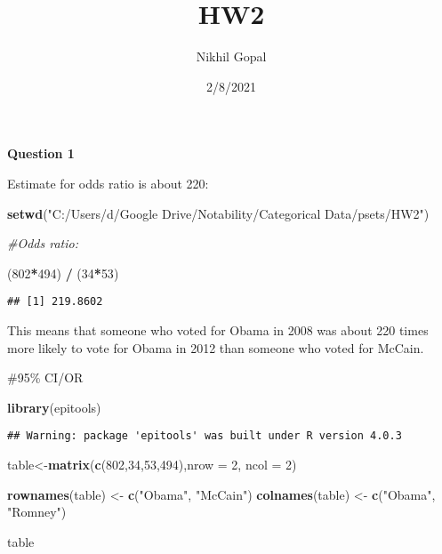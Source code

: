 \documentclass[
]{article}
\title{HW2}
\author{Nikhil Gopal}
\date{2/8/2021}
\newenvironment{Shaded}{\begin{snugshade}}{\end{snugshade}}
\newcommand{\CommentTok}[1]{\textcolor[rgb]{0.56,0.35,0.01}{\textit{#1}}}
\newcommand{\DataTypeTok}[1]{\textcolor[rgb]{0.13,0.29,0.53}{#1}}
\newcommand{\DecValTok}[1]{\textcolor[rgb]{0.00,0.00,0.81}{#1}}
\newcommand{\KeywordTok}[1]{\textcolor[rgb]{0.13,0.29,0.53}{\textbf{#1}}}
\newcommand{\NormalTok}[1]{#1}
\newcommand{\OperatorTok}[1]{\textcolor[rgb]{0.81,0.36,0.00}{\textbf{#1}}}
\newcommand{\StringTok}[1]{\textcolor[rgb]{0.31,0.60,0.02}{#1}}
\begin{document}
\maketitle

\textbf{Question 1}

Estimate for odds ratio is about 220:

\begin{Shaded}
\begin{Highlighting}[]
\KeywordTok{setwd}\NormalTok{(}\StringTok{"C:/Users/d/Google Drive/Notability/Categorical Data/psets/HW2"}\NormalTok{)}

\CommentTok{#Odds ratio: }

\NormalTok{(}\DecValTok{802}\OperatorTok{*}\DecValTok{494}\NormalTok{) }\OperatorTok{/}\StringTok{ }\NormalTok{(}\DecValTok{34}\OperatorTok{*}\DecValTok{53}\NormalTok{)}
\end{Highlighting}
\end{Shaded}

\begin{verbatim}
## [1] 219.8602
\end{verbatim}

This means that someone who voted for Obama in 2008 was about 220 times
more likely to vote for Obama in 2012 than someone who voted for McCain.

\#95\% CI/OR

\begin{Shaded}
\begin{Highlighting}[]
\KeywordTok{library}\NormalTok{(epitools)}
\end{Highlighting}
\end{Shaded}

\begin{verbatim}
## Warning: package 'epitools' was built under R version 4.0.3
\end{verbatim}

\begin{Shaded}
\begin{Highlighting}[]
\NormalTok{table<-}\KeywordTok{matrix}\NormalTok{(}\KeywordTok{c}\NormalTok{(}\DecValTok{802}\NormalTok{,}\DecValTok{34}\NormalTok{,}\DecValTok{53}\NormalTok{,}\DecValTok{494}\NormalTok{),}\DataTypeTok{nrow =} \DecValTok{2}\NormalTok{, }\DataTypeTok{ncol =} \DecValTok{2}\NormalTok{)}

\KeywordTok{rownames}\NormalTok{(table) <-}\StringTok{ }\KeywordTok{c}\NormalTok{(}\StringTok{"Obama"}\NormalTok{, }\StringTok{"McCain"}\NormalTok{)}
\KeywordTok{colnames}\NormalTok{(table) <-}\StringTok{ }\KeywordTok{c}\NormalTok{(}\StringTok{"Obama"}\NormalTok{, }\StringTok{"Romney"}\NormalTok{)}

\NormalTok{table}
\end{Highlighting}
\end{Shaded}
\end{document}
